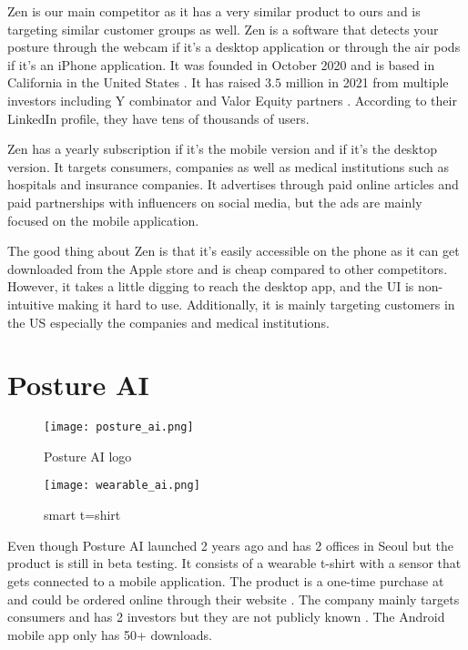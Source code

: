 Zen is our main competitor as it has a very similar product to ours and is targeting similar customer groups as well. Zen is a software that detects your posture through the webcam if it’s a desktop application or through the air pods if it’s an iPhone application.  It was founded in October 2020 and is based in California in the United States \cite{zen_crunchbase}. It has raised $3.5$ million in 2021 from multiple investors including Y combinator\cite{posturehealth_ycombinator} and Valor Equity partners \cite{zen_techcrunch}. According to their LinkedIn\cite{posturehealth_linkedin} profile, they have tens of thousands of users. 

Zen has a  yearly subscription if it’s the mobile version and  if it’s the desktop version. It targets consumers, companies as well as medical institutions such as hospitals and insurance companies. It advertises through paid online articles and paid partnerships with influencers on social media, but the ads are mainly focused on the mobile application.

The good thing about Zen is that it’s easily accessible on the phone as it can get downloaded from the Apple store and is cheap compared to other competitors. However, it takes a little digging to reach the desktop app, and the UI is non-intuitive making it hard to use. Additionally, it is mainly targeting customers in the US especially the companies and medical institutions.

\section{Posture AI}
\begin{figure}[h!]
    \centering
    \texttt{[image: posture\_ai.png]}
    \caption{Posture AI logo}
    \label{fig:enter-label0}
\end{figure}

\begin{figure}[h!]
    \centering
    \texttt{[image: wearable\_ai.png]}
    \caption{smart t=shirt}
    \label{fig:enter-label1}
\end{figure}
Even though Posture AI launched 2 years ago and has 2 offices in Seoul \cite{postureai_linkedin} but the product is still in beta testing. It consists of a wearable t-shirt with a sensor that gets connected to a mobile application. The product is a one-time purchase at  and could be ordered online through their website \cite{myposture}. The company mainly targets consumers and has 2 investors but they are not publicly known \cite{postureai_pitchbook}. The Android mobile app only has 50+ downloads. 

